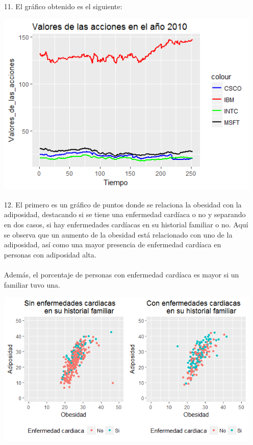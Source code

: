 \documentclass[11pt,a4paper]{article}
\begin{document}
\begin{itemize}
\newpage
\item[11.] El gráfico obtenido es el siguiente:
\begin{center}
\includegraphics[scale=0.6]{ggplot}
\end{center}
\item[12.]
El primero es un gráfico de puntos donde se relaciona la obesidad con la adiposidad, destacando si se tiene una enfermedad cardíaca o no y separando en dos casos, si hay enfermedades cardíacas en su historial familiar o no. Aquí se observa que un aumento de la obesidad está relacionado con uno de la adiposidad, así como una mayor presencia de enfermedad cardíaca en personas con adiposidad alta.\\
\\
Además, el porcentaje de personas con enfermedad cardíaca es mayor si un familiar tuvo una.
\begin{center}
\includegraphics[scale=0.75]{adiposidad}
\end{center}

\end{itemize}
\end{document}
